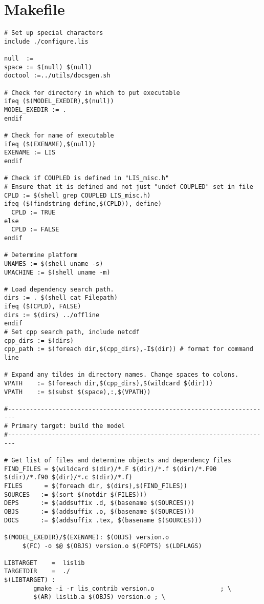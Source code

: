 
\section{Makefile} \label{sec:makefile}

\begin{verbatim}
# Set up special characters
include ./configure.lis

null  :=
space := $(null) $(null)
doctool :=../utils/docsgen.sh

# Check for directory in which to put executable
ifeq ($(MODEL_EXEDIR),$(null))
MODEL_EXEDIR := .
endif

# Check for name of executable
ifeq ($(EXENAME),$(null))
EXENAME := LIS
endif

# Check if COUPLED is defined in "LIS_misc.h"
# Ensure that it is defined and not just "undef COUPLED" set in file
CPLD := $(shell grep COUPLED LIS_misc.h)
ifeq ($(findstring define,$(CPLD)), define)
  CPLD := TRUE
else
  CPLD := FALSE
endif

# Determine platform
UNAMES := $(shell uname -s)
UMACHINE := $(shell uname -m)

# Load dependency search path.
dirs := . $(shell cat Filepath)
ifeq ($(CPLD), FALSE)
dirs := $(dirs) ../offline
endif
# Set cpp search path, include netcdf
cpp_dirs := $(dirs) 
cpp_path := $(foreach dir,$(cpp_dirs),-I$(dir)) # format for command line

# Expand any tildes in directory names. Change spaces to colons.
VPATH    := $(foreach dir,$(cpp_dirs),$(wildcard $(dir)))
VPATH    := $(subst $(space),:,$(VPATH))

#------------------------------------------------------------------------
# Primary target: build the model
#------------------------------------------------------------------------

# Get list of files and determine objects and dependency files
FIND_FILES = $(wildcard $(dir)/*.F $(dir)/*.f $(dir)/*.F90 $(dir)/*.f90 $(dir)/*.c $(dir)/*.f)
FILES      = $(foreach dir, $(dirs),$(FIND_FILES))
SOURCES   := $(sort $(notdir $(FILES)))
DEPS      := $(addsuffix .d, $(basename $(SOURCES)))
OBJS      := $(addsuffix .o, $(basename $(SOURCES)))
DOCS      := $(addsuffix .tex, $(basename $(SOURCES)))

$(MODEL_EXEDIR)/$(EXENAME): $(OBJS) version.o
	 $(FC) -o $@ $(OBJS) version.o $(FOPTS) $(LDFLAGS)

LIBTARGET    =  lislib
TARGETDIR    =  ./
$(LIBTARGET) : 
		gmake -i -r lis_contrib version.o                  ; \
		$(AR) lislib.a $(OBJS) version.o ; \


\end{verbatim}
